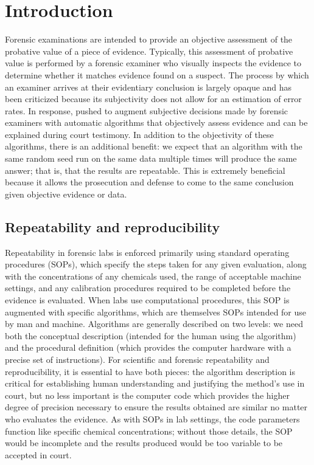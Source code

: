 \documentclass[11pt,]{isuthesis}
\begin{document}
\hypertarget{intro}{%
\section{Introduction}\label{intro}}

Forensic examinations are intended to provide an objective assessment of the probative value of a piece of evidence.
Typically, this assessment of probative value is performed by a forensic examiner who visually inspects the evidence to determine whether it matches evidence found on a suspect.
The process by which an examiner arrives at their evidentiary conclusion is largely opaque and has been criticized \citep{pcast2016} because its subjectivity does not allow for an estimation of error rates.
In response, \citet{council_strengthening_2009} pushed to augment subjective decisions made by forensic examiners with automatic algorithms that objectively assess evidence and can be explained during court testimony.
In addition to the objectivity of these algorithms, there is an additional benefit: we expect that an algorithm with the same random seed run on the same data multiple times will produce the same answer; that is, that the results are repeatable.
This is extremely beneficial because it allows the prosecution and defense to come to the same conclusion given objective evidence or data.

\hypertarget{repeatability-and-reproducibility}{%
\subsection{Repeatability and reproducibility}\label{repeatability-and-reproducibility}}

Repeatability in forensic labs is enforced primarily using standard operating procedures (SOPs), which specify the steps taken for any given evaluation, along with the concentrations of any chemicals used, the range of acceptable machine settings, and any calibration procedures required to be completed before the evidence is evaluated.
When labs use computational procedures, this SOP is augmented with specific algorithms, which are themselves SOPs intended for use by man and machine.
Algorithms are generally described on two levels: we need both the conceptual description (intended for the human using the algorithm) and the procedural definition (which provides the computer hardware with a precise set of instructions).
For scientific and forensic repeatability and reproducibility, it is essential to have both pieces: the algorithm description is critical for establishing human understanding and justifying the method's use in court, but no less important is the computer code which provides the higher degree of precision necessary to ensure the results obtained are similar no matter who evaluates the evidence.
As with SOPs in lab settings, the code parameters function like specific chemical concentrations; without those details, the SOP would be incomplete and the results produced would be too variable to be accepted in court.
\end{document}
